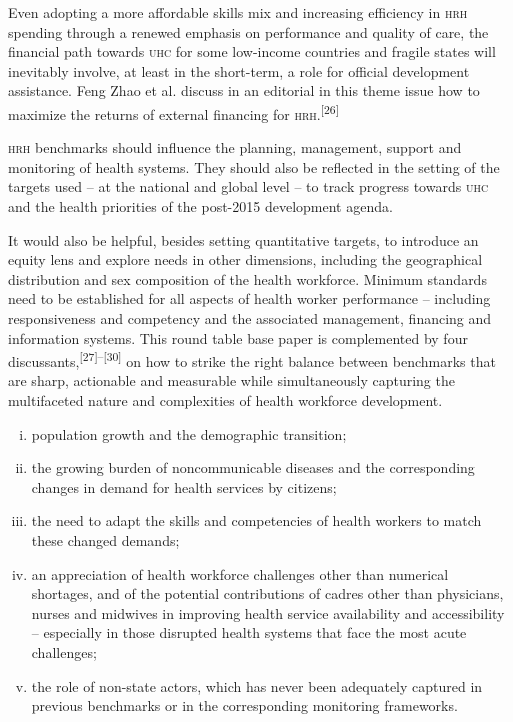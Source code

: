 \documentclass{article}
\begin{document}
Even adopting a more affordable skills mix and increasing efficiency in \textsc{hrh}
spending through a
renewed emphasis on performance and quality of care, the financial path towards
\textsc{uhc} for some
low-income countries and fragile states will inevitably involve, at least in the
short-term, a role
for official development assistance. Feng Zhao et al. discuss in an editorial in
this theme issue
how to maximize the returns of external financing for
\textsc{hrh}.\textsuperscript{[}\textsuperscript{26}\textsuperscript{]}

\textsc{hrh} benchmarks should influence the planning, management, support and monitoring
of health
systems. They should also be reflected in the setting of the targets used – at
the national
and global level – to track progress towards \textsc{uhc} and the health priorities of
the post-2015
development agenda.

It would also be helpful, besides setting quantitative targets, to introduce an
equity lens and
explore needs in other dimensions, including the geographical distribution and
sex composition of
the health workforce. Minimum standards need to be established for all aspects
of health worker
performance – including responsiveness and competency and the associated
management,
financing and information systems. This round table base paper is complemented
by four
discussants,\textsuperscript{[}\textsuperscript{27}\textsuperscript{]}\textsuperscript{–}\textsuperscript{[}\textsuperscript{30}\textsuperscript{]}
on how to strike the right balance between benchmarks
that are sharp, actionable and measurable while simultaneously capturing the
multifaceted nature and
complexities of health workforce development.

\begin{enumerate}[i.]
\item
population growth and the demographic transition;

\item
the growing burden of noncommunicable diseases and the corresponding changes in
demand for health
services by citizens;

\item
the need to adapt the skills and competencies of health workers to match these
changed
demands;

\item
an appreciation of health workforce challenges other than numerical shortages,
and of the
potential contributions of cadres other than physicians, nurses and midwives in
improving health
service availability and accessibility – especially in those disrupted health
systems that
face the most acute challenges;

\item
the role of non-state actors, which has never been adequately captured in
previous benchmarks or
in the corresponding monitoring frameworks.

\end{enumerate}
\end{document}
